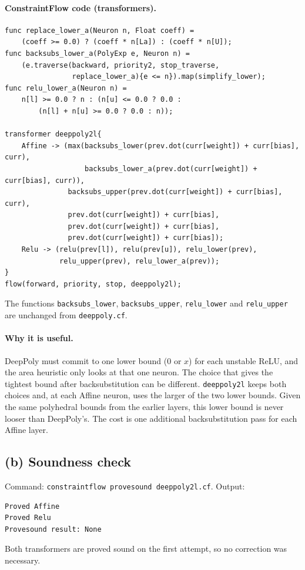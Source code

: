 \paragraph{ConstraintFlow code (transformers).}
\begin{verbatim}
func replace_lower_a(Neuron n, Float coeff) =
    (coeff >= 0.0) ? (coeff * n[La]) : (coeff * n[U]);
func backsubs_lower_a(PolyExp e, Neuron n) =
    (e.traverse(backward, priority2, stop_traverse,
                replace_lower_a){e <= n}).map(simplify_lower);
func relu_lower_a(Neuron n) =
    n[l] >= 0.0 ? n : (n[u] <= 0.0 ? 0.0 :
        (n[l] + n[u] >= 0.0 ? 0.0 : n));

transformer deeppoly2l{
    Affine -> (max(backsubs_lower(prev.dot(curr[weight]) + curr[bias], curr),
                   backsubs_lower_a(prev.dot(curr[weight]) + curr[bias], curr)),
               backsubs_upper(prev.dot(curr[weight]) + curr[bias], curr),
               prev.dot(curr[weight]) + curr[bias],
               prev.dot(curr[weight]) + curr[bias],
               prev.dot(curr[weight]) + curr[bias]);
    Relu -> (relu(prev[l]), relu(prev[u]), relu_lower(prev),
             relu_upper(prev), relu_lower_a(prev));
}
flow(forward, priority, stop, deeppoly2l);
\end{verbatim}
The functions \texttt{backsubs\_lower}, \texttt{backsubs\_upper},
\texttt{relu\_lower} and \texttt{relu\_upper} are unchanged from
\texttt{deeppoly.cf}.

\paragraph{Why it is useful.}
DeepPoly must commit to one lower bound ($0$ or $x$) for each
unstable ReLU, and the area heuristic only looks at that one neuron.
The choice that gives the tightest bound after backsubstitution can
be different. \texttt{deeppoly2l} keeps both choices and, at each
Affine neuron, uses the larger of the two lower bounds. Given the
same polyhedral bounds from the earlier layers, this lower bound is
never looser than DeepPoly's. The cost is one additional
backsubstitution pass for each Affine layer.

\subsection*{(b) Soundness check}

Command: \texttt{constraintflow provesound deeppoly2l.cf}. Output:
\begin{verbatim}
Proved Affine
Proved Relu
Provesound result: None
\end{verbatim}
Both transformers are proved sound on the first attempt, so no
correction was necessary.

